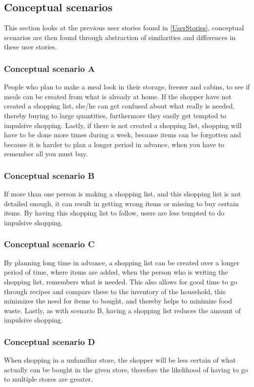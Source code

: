 \subsection{Conceptual scenarios} \label{conceptualScenarios}
This section looks at the previous user stories found in \cref{UserStories}, conceptual scenarios are then found through abstraction of similarities and differences in these user stories.

\subsubsection{Conceptual scenario A}
People who plan to make a meal look in their storage, freezer and cabins, to see if meals can be created from what is already at home. If the shopper have not created a shopping list, she/he can get confused about what really is needed, thereby buying to large quantities, furthermore they easily get tempted to impulsive shopping. Lastly, if there is not created a shopping list, shopping will have to be done more times during a week, because items can be forgotten and because it is harder to plan a longer period in advance, when you have to remember all you must buy.

\subsubsection{Conceptual scenario B}
If more than one person is making a shopping list, and this shopping list is not detailed enough, it can result in getting wrong items or missing to buy certain items. By having this shopping list to follow, users are less tempted to do impulsive shopping.

\subsubsection{Conceptual scenario C}
By planning long time in advance, a shopping list can be created over a longer period of time, where items are added, when the person who is writing the shopping list, remembers what is needed. This also allows for good time to go through recipes and compare these to the inventory of the household, this minimizes the need for items to bought, and thereby helps to minimize food waste. Lastly, as with scenario B, having a shopping list reduces the amount of impulsive shopping.

\subsubsection{Conceptual scenario D}
When shopping in a unfamiliar store, the shopper will be less certain of what actually can be bought in the given store, therefore the likelihood of having to go to multiple stores are greater.